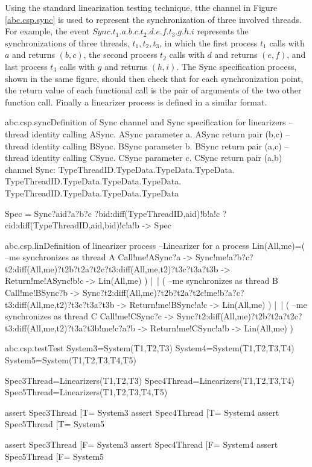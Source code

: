 \documentclass{article}
\begin{document}
Using the standard linearization testing technique, tthe  channel in Figure \ref{abc.csp.sync} is used to represent the synchronization of three involved threads. For example, the event $Sync.t_1.a.b.c.t_2.d.e.f.t_3.g.h.i$ represents the synchronizations of three threads, $t_1,t_2,t_3$, in which the first process $t_1$ calls  with $a$ and returns $(b,c)$, the second process $t_2$ calls  with $d$ and returns $(e,f)$, and last process $t_3$ calls  with $g$ and returns $(h,i)$. The Sync specification process, shown in the same figure, should then check that for each synchronization point, the return value of each functional call is the pair of arguments of the two other function call. Finally a linearizer process is defined in a similar format. 

\begin{cspinline}{abc.csp.sync}{Definition of Sync channel and Sync specification for linearizers}
--thread identity calling ASync. ASync parameter a. ASync return pair (b,c)
--thread identity calling BSync. BSync parameter b. BSync return pair (a,c)
--thread identity calling CSync. CSync parameter c. CSync return pair (a,b)
channel Sync: TypeThreadID.TypeData.TypeData.TypeData.
              TypeThreadID.TypeData.TypeData.TypeData.
              TypeThreadID.TypeData.TypeData.TypeData

Spec = Sync?aid?a?b?c
           ?bid:diff(TypeThreadID,{aid})!b!a!c
           ?cid:diff(TypeThreadID,{aid,bid})!c!a!b 
    -> Spec
\end{cspinline}

\begin{cspinline}{abc.csp.lin}{Definition of linearizer process}
--Linearizer for a process
Lin(All,me)=(
  --me synchronizes as thread A
  Call!me!ASync?a ->
  Sync!me!a?b?c?t2:diff(All,{me})?t2b?t2a?t2c?t3:diff(All,{me,t2})?t3c?t3a?t3b ->
  Return!me!ASync!b!c ->
  Lin(All,me)
) |~| (
  --me synchronizes as thread B
  Call!me!BSync?b ->
  Sync?t2:diff(All,{me})?t2b?t2a?t2c!me!b?a?c?t3:diff(All,{me,t2})?t3c?t3a?t3b ->
  Return!me!BSync!a!c ->
  Lin(All,me)
) |~| (
  --me synchronizes as thread C
  Call!me!CSync?c ->
  Sync?t2:diff(All,{me})?t2b?t2a?t2c?t3:diff(All,{me,t2})?t3a?t3b!me!c?a?b ->
  Return!me!CSync!a!b ->
  Lin(All,me)
)
\end{cspinline}

\begin{cspinline}{abc.csp.test}{Test}
System3=System({T1,T2,T3})
System4=System({T1,T2,T3,T4})
System5=System({T1,T2,T3,T4,T5})

Spec3Thread=Linearizers({T1,T2,T3})
Spec4Thread=Linearizers({T1,T2,T3,T4})
Spec5Thread=Linearizers({T1,T2,T3,T4,T5})

assert Spec3Thread [T= System3
assert Spec4Thread [T= System4
assert Spec5Thread [T= System5

assert Spec3Thread [F= System3
assert Spec4Thread [F= System4
assert Spec5Thread [F= System5
\end{cspinline}
\end{document}
